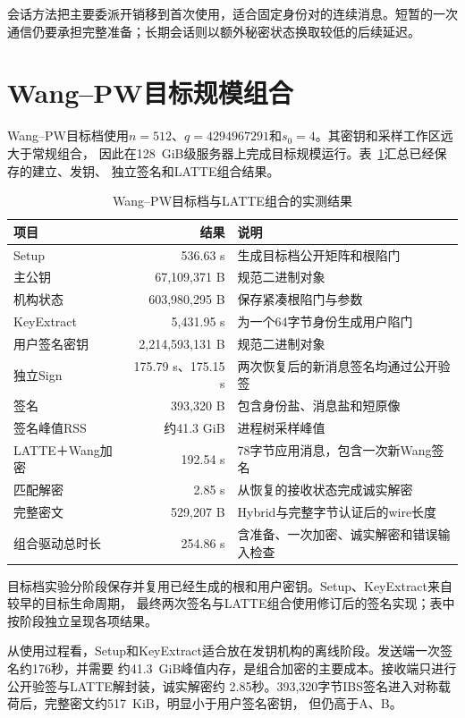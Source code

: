 会话方法把主要委派开销移到首次使用，适合固定身份对的连续消息。短暂的一次通信仍要承担完整准备；长期会话则以额外秘密状态换取较低的后续延迟。

\section{Wang--PW目标规模组合}

Wang--PW目标档使用$n=512$、$q=4294967291$和$s_0=4$。其密钥和采样工作区远大于常规组合，
因此在128~GiB级服务器上完成目标规模运行。表~\ref{tab:wang-results}汇总已经保存的建立、发钥、
独立签名和LATTE组合结果。

\begin{table}[H]
\centering\small
\caption{Wang--PW目标档与LATTE组合的实测结果}
\label{tab:wang-results}
\begin{tabularx}{\textwidth}{@{}p{}rX@{}}
\toprule
\rowcolor{black!8} 项目 & 结果 & 说明 \\
\midrule
Setup & 536.63 s & 生成目标档公开矩阵和根陷门 \\
主公钥 & 67,109,371 B & 规范二进制对象 \\
机构状态 & 603,980,295 B & 保存紧凑根陷门与参数 \\
KeyExtract & 5,431.95 s & 为一个64字节身份生成用户陷门 \\
用户签名密钥 & 2,214,593,131 B & 规范二进制对象 \\
独立Sign & 175.79 s、175.15 s & 两次恢复后的新消息签名均通过公开验签 \\
签名 & 393,320 B & 包含身份盐、消息盐和短原像 \\
签名峰值RSS & 约41.3 GiB & 进程树采样峰值 \\
LATTE＋Wang加密 & 192.54 s & 78字节应用消息，包含一次新Wang签名 \\
匹配解密 & 2.85 s & 从恢复的接收状态完成诚实解密 \\
完整密文 & 529,207 B & Hybrid与完整字节认证后的wire长度 \\
组合驱动总时长 & 254.86 s & 含准备、一次加密、诚实解密和错误输入检查 \\
\bottomrule
\end{tabularx}
\end{table}

目标档实验分阶段保存并复用已经生成的根和用户密钥。Setup、KeyExtract来自较早的目标生命周期，
最终两次签名与LATTE组合使用修订后的签名实现；表中按阶段独立呈现各项结果。

从使用过程看，Setup和KeyExtract适合放在发钥机构的离线阶段。发送端一次签名约176秒，并需要
约41.3~GiB峰值内存，是组合加密的主要成本。接收端只进行公开验签与LATTE解封装，诚实解密约
2.85秒。393,320字节IBS签名进入对称载荷后，完整密文约517~KiB，明显小于用户签名密钥，
但仍高于A、B。

